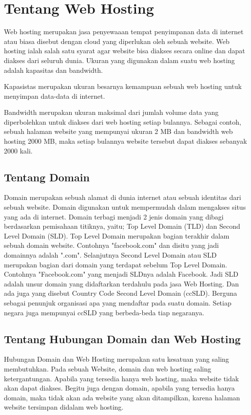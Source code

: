 \documentclass[12pt, a4paper]{article}
\begin{document}
\section{Tentang Web Hosting}
Web hosting merupakan jasa penyewaaan tempat penyimpanan data di internet atau biasa disebut dengan cloud
yang diperlukan oleh sebuah website. Web hosting ialah salah satu syarat agar website bisa diakses secara 
online dan dapat diakses dari seluruh dunia. Ukuran yang digunakan dalam suatu web hosting adalah kapasitas
dan bandwidth. 

Kapasistas merupakan ukuran besarnya kemampuan sebuah web hosting untuk menyimpan data-data di internet.

Bandwidth merupakan ukuran maksimal dari jumlah volume data yang diperbolehkan untuk diakses dari web hosting
setiap bulannya. Sebagai contoh, sebuah halaman website yang mempunyai ukuran 2 MB dan bandwidth web hosting
2000 MB, maka setiap bulannya website tersebut dapat diakses sebanyak 2000 kali.

\subsection{Tentang Domain}
Domain merupakan sebuah alamat di dunia internet atau sebuah identitas dari sebuah website. Domain digunakan untuk mempermudah dalam mengakses situs yang ada di internet. Domain terbagi menjadi 2 jenis domain yang dibagi berdasarkan pemisahaan titiknya, yaitu; Top Level Domain (TLD) dan Second Level Domain (SLD). Top Level Domain merupakan bagian terakhir dalam sebuah domain website. Contohnya "facebook.com" dan disitu yang jadi domainnya adalah ".com". Selanjutnya Second Level Domain atau SLD merupakan bagian dari domain yang terdapat sebelum Top Level Domain. Contohnya "Facebook.com" yang menjadi SLDnya adalah Facebook. Jadi SLD adalah unsur domain yang didaftarkan terdahulu pada jasa Web Hosting. Dan ada juga yang disebut Country Code Second Level Domain (ccSLD). Berguna sebagai penunjuk organisasi apa yang mendaftar pada suatu domain. Setiap negara juga mempunyai ccSLD yang berbeda-beda tiap negaranya.

\subsection{Tentang Hubungan Domain dan Web Hosting}
Hubungan Domain dan Web Hosting merupakan satu kesatuan yang saling membutuhkan.
Pada sebuah Website, domain dan web hosting saling ketergantungan. Apabila yang tersedia hanya web hosting, maka website tidak akan dapat diakses. Begitu juga dengan domain, apabila yang tersedia hanya domain, maka tidak akan ada website yang akan ditampilkan, karena halaman website tersimpan didalam web hosting.
\end{document}
